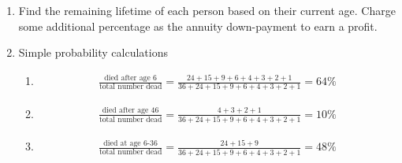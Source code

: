 \begin{enumerate}
	
	\item Find the remaining lifetime of each person based on their current age. Charge some additional percentage as the annuity down-payment to earn a profit.
	
	\item Simple probability calculations \\
	
	
		\begin{enumerate}
			\item \begin{align}
				\frac{\text{died after age 6}}{\text{total number dead}} = \frac{24+15+9+6+4+3+2+1}{36+24+15+9+6+4+3+2+1} = 64 \%
			\end{align}
			
			\item \begin{align}
				\frac{\text{died after age 46}}{\text{total number dead}} = 
				\frac{4+3+2+1}{36+24+15+9+6+4+3+2+1} = 10 \%
			\end{align}
			
			\item \begin{align}
				\frac{\text{died at age 6-36}}{\text{total number dead}} = 
				\frac{24+15+9}{36+24+15+9+6+4+3+2+1} = 48 \%
			\end{align}
			
		\end{enumerate}
	
	
\end{enumerate}